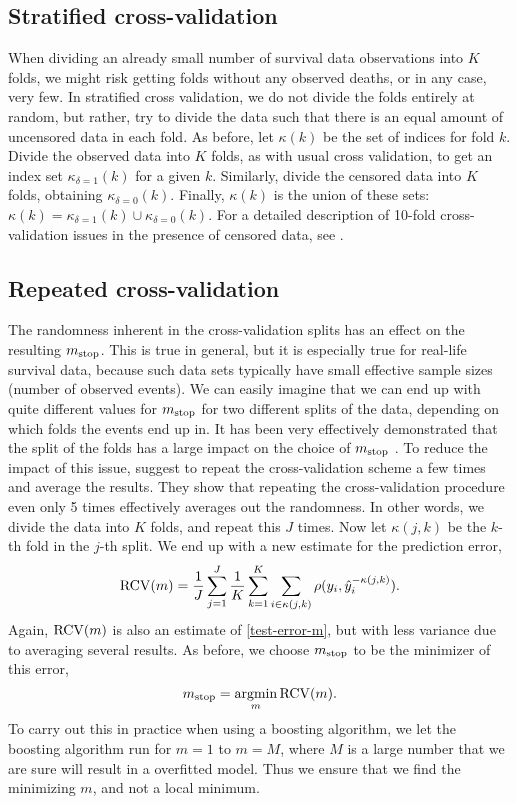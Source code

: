 \subsection{Stratified cross-validation}
When dividing an already small number of survival data observations into $K$ folds, we might risk getting folds without any observed deaths, or in any case, very few. In stratified cross validation, we do not divide the folds entirely at random, but rather, try to divide the data such that there is an equal amount of uncensored data in each fold.
As before, let $\kappa(k)$ be the set of indices for fold $k$.
Divide the observed data into $K$ folds, as with usual cross validation, to get an index set $\kappa_{\delta=1}(k)$ for a given $k$. 
Similarly, divide the censored data into $K$ folds, obtaining $\kappa_{\delta=0}(k)$.
Finally, $\kappa(k)$ is the union of these sets: $\kappa(k)=\kappa_{\delta=1}(k)\cup\kappa_{\delta=0}(k)$.
For a detailed description of 10-fold cross-validation issues in the presence of censored data, see \citet{kohavi}.

\subsection{Repeated cross-validation}\label{subsec:repeated-cv}
The randomness inherent in the cross-validation splits has an effect on the resulting $m_{\text{stop}}$.
This is true in general, but it is especially true for real-life survival data, because such data sets typically have small effective sample sizes (number of observed events).
We can easily imagine that we can end up with quite different values for $m_{\text{stop}}$ for two different splits of the data, depending on which folds the events end up in.
It has been very effectively demonstrated that the split of the folds has a large impact on the choice of $m_{\text{stop}}$ \citep{seibold}.
To reduce the impact of this issue, \citet{seibold} suggest to repeat the cross-validation scheme a few times and average the results.
They show that repeating the cross-validation procedure even only 5 times effectively averages out the randomness.
In other words, we divide the data into $K$ folds, and repeat this $J$ times.
Now let $\kappa(j, k)$ be the $k$-th fold in the $j$-th split.
We end up with a new estimate for the prediction error,
\begin{equation*}
    \operatorname{RCV}(m)=\frac{1}{J}\sum_{j=1}^J\frac{1}{K}\sum_{k=1}^K\sum_{i\in\kappa(j,k)}\rho(y_i,\hat{y}_i^{-\kappa(j,k)}).
\end{equation*}
Again, $\operatorname{RCV}(m)$ is also an estimate of \eqref{test-error-m}, but with less variance due to averaging several results.
As before, we choose $m_{\text{stop}}$ to be the minimizer of this error,
\begin{equation*}
    m_{\text{stop}}=\operatorname*{argmin}_{m}\operatorname{RCV}(m).
\end{equation*}
To carry out this in practice when using a boosting algorithm, we let the boosting algorithm run for $m=1$ to $m=M$, where $M$ is a large number that we are sure will result in a overfitted model.
Thus we ensure that we find the minimizing $m$, and not a local minimum.

